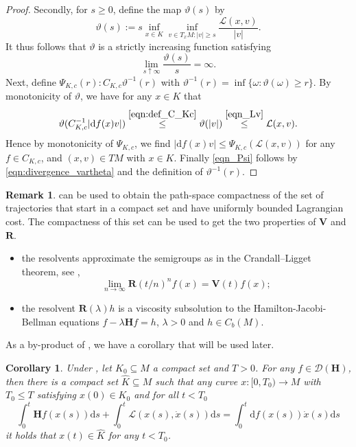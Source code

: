 \documentclass[a4paper]{article}
\newcommand{\cL}{\mathcal{L}}
\newcommand{\dd}{ \mathrm{d}}
\numberwithin{equation}{section}
\newtheorem{corollary}[theorem]{Corollary}
\theoremstyle{definition}
\newtheorem{remark}[theorem]{Remark}
\begin{document}
\begin{proof}
	Secondly, for $s\geq 0$, define the map $\vartheta(s)$ by
	\begin{equation}\label{eqn_Lv}
		\vartheta(s):= s \inf_{x \in K} \inf_{v \in T_xM: |v| \geq s}\frac{\cL(x,v)}{|v|}.
	\end{equation}
	It thus follows that $\vartheta$ is a strictly increasing function satisfying
    \begin{equation}\label{eqn:divergence_vartheta}
        \lim_{s \uparrow \infty} \frac{\vartheta(s)}{s} = \infty.
    \end{equation}
 Next, define $\Psi_{K,c}(r):C_{K,c}\vartheta^{-1}(r)$ with $\vartheta^{-1}(r)=\inf\{\omega:\vartheta(\omega)\geq r\}$. By monotonicity of $\vartheta$, we have for any $x \in K$ that
	\begin{equation*}
		\vartheta(C^{-1}_{K,c}|\mathrm{d}f(x) v|)\overset{\eqref{eqn:def_C_Kc}}\leq \vartheta(|v|) \overset{\eqref{eqn_Lv}}\leq \cL(x,v).
	\end{equation*}
	Hence by monotonicity of $\Psi_{K,c}$, we find $|\mathrm{d} f(x) v|\leq \Psi_{K,c}(\cL(x,v))$ for any $f \in C_{K,c}$, and $(x,v) \in TM$ with $x \in K$. Finally \eqref{eqn_Psi} follows by \eqref{eqn:divergence_vartheta} and the definition of $\vartheta^{-1}(r)$.
\end{proof}
\begin{remark}
 can be used to obtain the path-space compactness of the set of trajectories that start in a compact set and have uniformly bounded Lagrangian cost. The compactness of this set can be used to get the two properties of $\mathbf{V}$ and $\mathbf{R}$.
\begin{itemize}
	\item the resolvents approximate the semigroups as in the Crandall–Ligget theorem, see \cite[Lemma 8.18]{FK2006},
	\begin{equation*}
		\lim_{n\to \infty} \mathbf{R}(t/n)^{n}f(x) = \mathbf{V}(t) f(x); 
	\end{equation*}
	\item the resolvent $\mathbf{R}(\lambda)h$ is a viscosity subsolution to the Hamilton-Jacobi-Bellman equations $f-\lambda \mathbf{H}f=h$, $\lambda> 0$ and $h \in C_b(M)$.
\end{itemize}
\end{remark}
As a by-product of , we have a corollary that will be used later.
\begin{corollary} \label{lemma:control_on_local_curves_compactness} Under ,
let $K_0\subseteq M$ a compact set and $T > 0$. For any $f\in \mathcal{D}(\mathbf{H})$, then there is a compact set $\hat{K} \subseteq M$ such that any curve $x : [0,T_0)\to M$ with $T_0 \leq T$ satisfying $x(0) \in K_0$ and for all $t < T_0$
\begin{equation} \label{eqn:satisfy_Young}
    \int_0^t \mathbf{H}f(x(s)) \dd s + \int_0^t \cL(x(s),\dot{x}(s)) \dd s = \int_0^t \dd f(x(s)) \dot{x}(s) \dd s
\end{equation}
it holds that $x(t) \in \hat{K}$ for any $t < T_0$.
\end{corollary}
\end{document}
